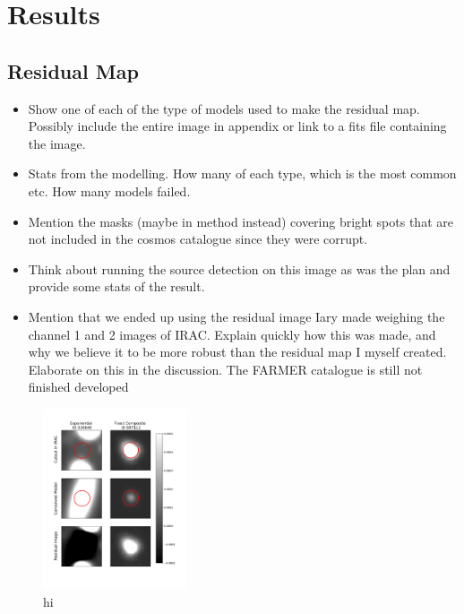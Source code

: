 \section{Results}

\subsection{Residual Map}
\begin{itemize}
    \item Show one of each of the type of models used to make the residual map. Possibly include the entire image in appendix or link to a fits file containing the image.
    \item Stats from the modelling. How many of each type, which is the most common etc. How many models failed.
    \item Mention the masks (maybe in method instead) covering bright spots that are not included in the cosmos catalogue since they were corrupt.
    \item Think about running the source detection on this image as was the plan and provide some stats of the result.
    \item Mention that we ended up using the residual image Iary made weighing the channel 1 and 2 images of IRAC. Explain quickly how this was made, and why we believe it to be more robust than the residual map I myself created. Elaborate on this in the discussion. The FARMER catalogue is still not finished developed
\end{itemize} 

\begin{figure}
    \centering %
    \includegraphics[trim={1cm 2.5cm 2cm 1.5cm},clip,width=0.38\textwidth]{Code/Saved_Figures/BAD_model_cutouts.pdf}
    \caption{hi}
    \label{BAD_Model_cutouts}  
\end{figure}

